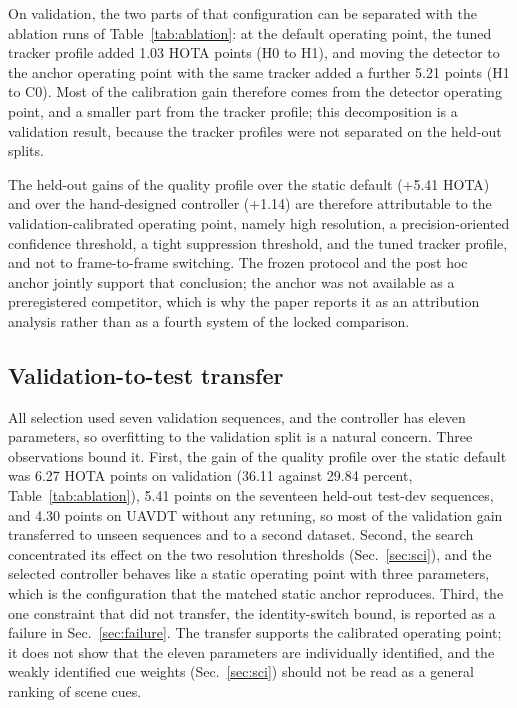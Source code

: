 \documentclass[journal]{new-aiaa}
\begin{document}
On validation, the two parts of that configuration can be separated with the ablation runs of Table~\ref{tab:ablation}: at the default operating point, the tuned tracker profile added 1.03 HOTA points (H0 to H1), and moving the detector to the anchor operating point with the same tracker added a further 5.21 points (H1 to C0). Most of the calibration gain therefore comes from the detector operating point, and a smaller part from the tracker profile; this decomposition is a validation result, because the tracker profiles were not separated on the held-out splits.

The held-out gains of the quality profile over the static default (+5.41 HOTA) and over the hand-designed controller (+1.14) are therefore attributable to the validation-calibrated operating point, namely high resolution, a precision-oriented confidence threshold, a tight suppression threshold, and the tuned tracker profile, and not to frame-to-frame switching. The frozen protocol and the post hoc anchor jointly support that conclusion; the anchor was not available as a preregistered competitor, which is why the paper reports it as an attribution analysis rather than as a fourth system of the locked comparison.

\subsection{Validation-to-test transfer}
All selection used seven validation sequences, and the controller has eleven parameters, so overfitting to the validation split is a natural concern. Three observations bound it. First, the gain of the quality profile over the static default was 6.27 HOTA points on validation (36.11 against 29.84 percent, Table~\ref{tab:ablation}), 5.41 points on the seventeen held-out test-dev sequences, and 4.30 points on UAVDT without any retuning, so most of the validation gain transferred to unseen sequences and to a second dataset. Second, the search concentrated its effect on the two resolution thresholds (Sec.~\ref{sec:sci}), and the selected controller behaves like a static operating point with three parameters, which is the configuration that the matched static anchor reproduces. Third, the one constraint that did not transfer, the identity-switch bound, is reported as a failure in Sec.~\ref{sec:failure}. The transfer supports the calibrated operating point; it does not show that the eleven parameters are individually identified, and the weakly identified cue weights (Sec.~\ref{sec:sci}) should not be read as a general ranking of scene cues.
\end{document}
